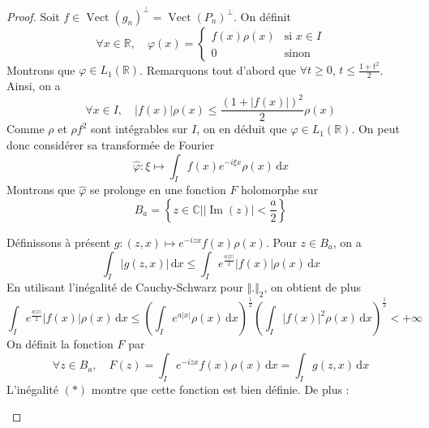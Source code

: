   \begin{proof}
    Soit $f \in \operatorname{Vect}(g_n)^\perp = \operatorname{Vect}(P_n)^\perp$. On définit
    \[
    \forall x \in \mathbb{R}, \quad \varphi(x) = \begin{cases} f(x) \rho(x) &\text{si } x \in I \\ 0 &\text{sinon} \end{cases}
    \]
    Montrons que $\varphi \in L_1(\mathbb{R})$. Remarquons tout d'abord que $\forall t \geq 0$, $t \leq \frac{1 + t^2}{2}$. Ainsi, on a
    \[ \forall x \in I, \quad |f(x)|\rho(x) \leq \frac{(1 + |f(x)|)^2}{2} \rho(x) \]
    Comme $\rho$ et $\rho f^2$ sont intégrables sur $I$, on en déduit que $\varphi \in L_1(\mathbb{R})$. On peut donc considérer sa transformée de Fourier
    \[ \widehat{\varphi} : \xi \mapsto \int_I f(x) e^{-i \xi x} \rho(x) \, \mathrm{d}x \]
    Montrons que $\widehat{\varphi}$ se prolonge en une fonction $F$ holomorphe sur
    \[ B_a = \left\{ z \in \mathbb{C} \mid \vert \operatorname{Im}(z) \vert < \frac{a}{2} \right\} \]
    \begin{center}
    \end{center}
    Définissons à présent $g : (z, x) \mapsto e^{-izx} f(x) \rho(x)$. Pour $z \in B_a$, on a
    \[ \int_I \vert g(z, x) \vert \, \mathrm{d}x \leq \int_I e^{\frac{a \vert x \vert}{2}} \vert f(x) \vert \rho(x) \, \mathrm{d}x \]
    En utilisant l'inégalité de Cauchy-Schwarz pour $\Vert . \Vert_2$, on obtient de plus
    \[ \int_I e^{\frac{a \vert x \vert}{2}} \vert f(x) \vert \rho(x) \, \mathrm{d}x \leq \left( \int_I e^{a \vert x \vert} \rho(x) \, \mathrm{d}x \right)^{\frac{1}{2}} \left( \int_I \vert f(x) \vert^2 \rho(x) \, \mathrm{d}x \right)^{\frac{1}{2}} < + \infty \tag{$*$} \]
    On définit la fonction $F$ par
    \[ \forall z \in B_a , \quad F(z) = \int_I e^{-izx} f(x) \rho(x) \, \mathrm{d}x = \int_I g(z, x) \, \mathrm{d}x \]
    L'inégalité $(*)$ montre que cette fonction est bien définie. De plus :
    \begin{itemize}

\end{itemize}
\end{proof}

